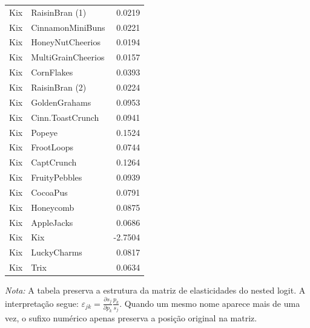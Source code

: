 \begin{table}[H]
\begin{tabular}{llr}
Kix & RaisinBran (1) & 0.0219 \\
Kix & CinnamonMiniBuns & 0.0221 \\
Kix & HoneyNutCheerios & 0.0194 \\
Kix & MultiGrainCheerios & 0.0157 \\
Kix & CornFlakes & 0.0393 \\
Kix & RaisinBran (2) & 0.0224 \\
Kix & GoldenGrahams & 0.0953 \\
Kix & Cinn.ToastCrunch & 0.0941 \\
Kix & Popeye & 0.1524 \\
Kix & FrootLoops & 0.0744 \\
Kix & CaptCrunch & 0.1264 \\
Kix & FruityPebbles & 0.0939 \\
Kix & CocoaPus & 0.0791 \\
Kix & Honeycomb & 0.0875 \\
Kix & AppleJacks & 0.0686 \\
Kix & Kix & -2.7504 \\
Kix & LuckyCharms & 0.0817 \\
Kix & Trix & 0.0634 \\
\bottomrule
\end{tabular}

\vspace{0.3em}
\footnotesize
\textit{Nota:} A tabela preserva a estrutura da matriz de elasticidades do nested logit. A interpretação segue: $\varepsilon_{jk}=\frac{\partial s_j}{\partial p_k}\frac{p_k}{s_j}$. Quando um mesmo nome aparece mais de uma vez, o sufixo numérico apenas preserva a posição original na matriz.
\end{table}
\endgroup


